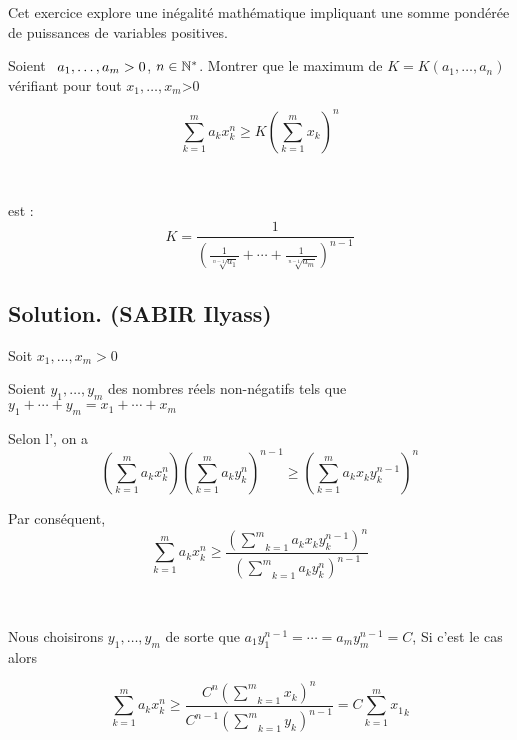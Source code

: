 Cet exercice explore une in{\'e}galit{\'e} math{\'e}matique impliquant une
somme pond{\'e}r{\'e}e de puissances de variables positives.

\begin{exercise}[]
Soient \ ${\color[HTML]{000000}a_1, \ldots, a_m > 0}$, ${\color[HTML]{000000}n
\in \mathbb{N}^{\ast}}$. Montrer que le maximum de $K = K
(a_1, \ldots, a_n)$ v{\'e}rifiant pour tout {$x_1, \ldots,
x_m$}>0

{\[ {\underset{k = 1}{\overset{m}{\sum}} a_k x^{n
   }_k \geqslant K \left( \underset{k = 1}{\overset{m}{\sum}} x_k \right)^{n
   }} \]}

\

est :
\[ {K = \frac{1}{\left( \frac{1}{\sqrt[n - 1]{a_1}} + \cdots +
   \frac{1}{\sqrt[n - 1]{a_m}} \right)^{n - 1}}} \]

\end{exercise}

\subsection*{Solution. (SABIR Ilyass)}


Soit $x_1, \ldots, x_m > 0$

Soient $y_1, \ldots, y_m$ des nombres r{\'e}els non-n{\'e}gatifs tels que $y_1
+ \cdots + y_m = x_1 + \cdots + x_m$

Selon l', on a
\[ \left( \underset{k = 1}{\overset{m}{\sum}} a_k x^{n }_k
   \underset{}{\overset{}{}} \right) \left( \underset{k =
   1}{\overset{m}{\sum}} a_k y^{n }_k \right)^{n - 1} \geqslant \left(
   \underset{k = 1}{\overset{m}{\sum}} a_k x^{}_k y^{n - 1}_k \right)^n \]


Par cons{\'e}quent,
\[ \underset{k = 1}{\overset{m}{\sum}} a_k x^{n }_k \underset{}{\overset{}{}}
   \geqslant \frac{\left( \underset{k = 1}{\overset{m}{\sum}} a_k x^{}_k y^{n
   - 1}_k \right)^n}{\left( \underset{k = 1}{\overset{m}{\sum}} a_k y^{n }_k
   \right)^{n - 1}} \]


\

Nous choisirons $y_1, \ldots, y_m$ de sorte que $a_1 y^{n - 1}_1 = \cdots =
a_m y^{n - 1}_m = C $, Si c'est le cas alors


\[ \underset{k = 1}{\overset{m}{\sum}} a_k x^{n }_k \underset{}{\overset{}{}}
   \geqslant \frac{C^n \left( \underset{k = 1}{\overset{m}{\sum}} x^{}_k
   \right)^n}{C^{n - 1} \left( \underset{k = 1}{\overset{m}{\sum}} y _k
   \right)^{n - 1}} = C \underset{k = 1}{\overset{m}{\sum}} {x_1^{}}_k \]


